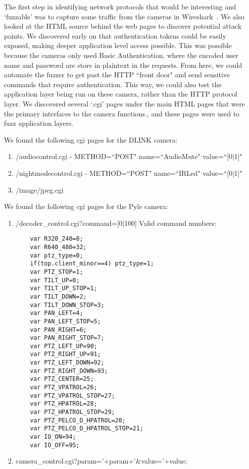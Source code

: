 \documentclass[letterpaper,twocolumn,10pt]{article}
\begin{document}
The first step in identifying network protocols that would be interesting and `fuzzable' was to capture some traffic from the cameras in Wireshark~\cite{wireshark}. We also looked at the HTML source behind the web pages to discover potential attack points. We discovered early on that authentication tokens could be easily exposed, making deeper application level access possible. This was possible because the cameras only used Basic Authentication, where the encoded user name and password are store in plaintext in the requests. From here, we could automate the fuzzer to get past the HTTP ``front door" and send sensitive commands that require authentication. This way, we could also test the application layer being run on these camera, rather than the HTTP protocol layer. We discovered several `.cgi' pages under the main HTML pages that were the primary interfaces to the camera functions., and these pages were used to fuzz application layers.

We found the following cgi pages for the DLINK camera: 


\begin{enumerate}
	\item /audiocontrol.cgi - METHOD=``POST" name=``AudioMute" value=``[0$\mid$1]"
	\item /nightmodecontrol.cgi - METHOD=``POST" name=``IRLed" value=``[0$\mid$1]"
	\item /image/jpeg.cgi
\end{enumerate}

We found the following cgi pages for the Pyle camera:
\begin{enumerate}
	\item /decoder\_control.cgi?command=[0$\mid$100]
	\newline Valid command numbers:
	\begin{verbatim}
	var R320_240=8;
	var R640_480=32;
	var ptz_type=0;	
	if(top.client_minor==4) ptz_type=1;
	var PTZ_STOP=1;
	var TILT_UP=0;
	var TILT_UP_STOP=1;
	var TILT_DOWN=2;
	var TILT_DOWN_STOP=3;
	var PAN_LEFT=4;
	var PAN_LEFT_STOP=5;
	var PAN_RIGHT=6;
	var PAN_RIGHT_STOP=7;
	var PTZ_LEFT_UP=90;
	var PTZ_RIGHT_UP=91;
	var PTZ_LEFT_DOWN=92;
	var PTZ_RIGHT_DOWN=93;
	var PTZ_CENTER=25;
	var PTZ_VPATROL=26;
	var PTZ_VPATROL_STOP=27;
	var PTZ_HPATROL=28;
	var PTZ_HPATROL_STOP=29;
	var PTZ_PELCO_D_HPATROL=20;
	var PTZ_PELCO_D_HPATROL_STOP=21;
	var IO_ON=94;
	var IO_OFF=95;
	\end{verbatim}
	\item camera\_control.cgi?param='+param+'\&value='+value; 
\end{enumerate}
\end{document}

